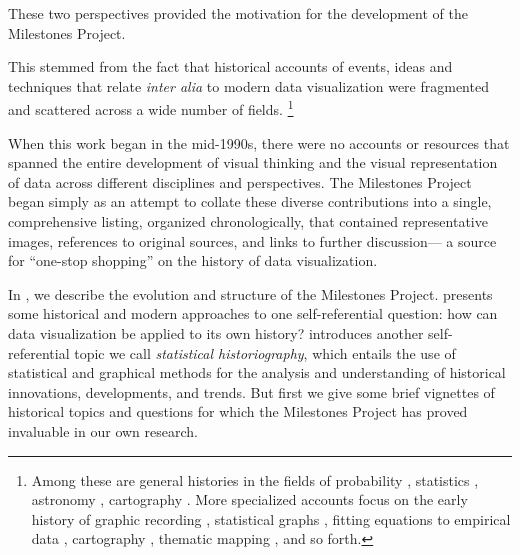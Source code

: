 These two perspectives provided the motivation for the development of the 
Milestones Project. 

This stemmed from the fact that historical accounts of events, ideas and 
techniques that relate \emph{inter alia} to modern data visualization were 
fragmented and scattered across a wide number of fields.%
\footnote{
Among these are general histories in the fields of probability 
\citep{Hald:1990}, statistics \citep{Pearson:1978,Porter:1986,Stigler:1986}, 
astronomy \citep{Riddell:1980}, cartography \citep{WallisRobinson:87}.
More specialized accounts focus on the early history of graphic recording 
\citep{HoffGeddes:1959,HoffGeddes:1962}, statistical graphs 
\citep{Funkhouser:1936,Funkhouser:1937,Royston:1970,Tilling:1975}, fitting 
equations to empirical data \citep{Farebrother:1999}, cartography 
\citep{Friis:1974,Kruskal:1977}, thematic mapping 
\citep{FriendlyPalsky:2007,Palsky:1996,Robinson:1982}, and so forth.
}

When this work began in the mid-1990s, there were no accounts or resources that 
spanned the entire development of visual thinking and the visual representation 
of data across different disciplines and perspectives.
The Milestones Project began simply as an attempt to collate these diverse 
contributions into a single, comprehensive listing, organized chronologically, 
that contained representative images, references to original sources, and links 
to further discussion--- a source for ``one-stop shopping'' on the history of 
data visualization.

In , we describe the evolution and structure of the 
Milestones Project.  presents some historical and modern 
approaches to one self-referential question: how can data visualization be 
applied to its own history? 
 introduces another self-referential topic we call 
\emph{statistical historiography}, which entails the use of statistical and 
graphical methods for the analysis and understanding of historical innovations, 
developments, and trends.
But first we give some brief vignettes of historical topics and questions for 
which the Milestones Project has proved invaluable in our own research.

